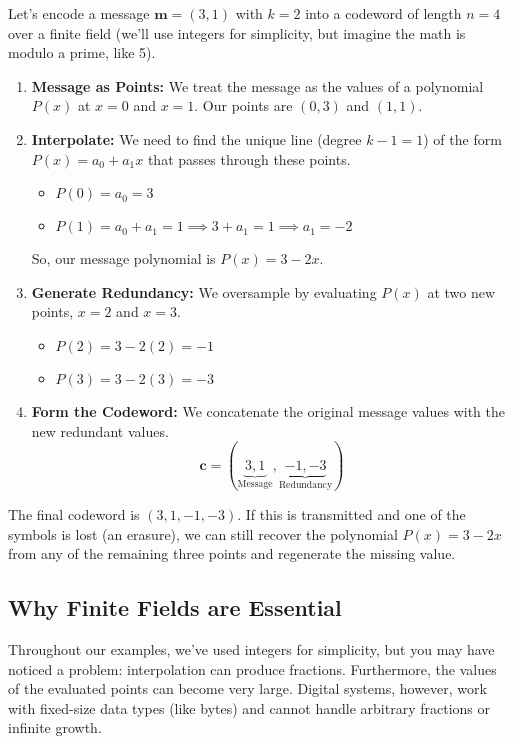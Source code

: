 \documentclass{article}
\begin{document}
\begin{tcolorbox}[title={Example: Systematic RS Encoding}]
Let's encode a message $\mathbf{m}=(3, 1)$ with $k=2$ into a codeword of length $n=4$ over a finite field (we'll use integers for simplicity, but imagine the math is modulo a prime, like 5).
\begin{enumerate}
    \item \textbf{Message as Points:} We treat the message as the values of a polynomial $P(x)$ at $x=0$ and $x=1$. Our points are $(0, 3)$ and $(1, 1)$.
    \item \textbf{Interpolate:} We need to find the unique line (degree $k-1=1$) of the form $P(x) = a_0 + a_1 x$ that passes through these points.
    \begin{itemize}
        \item $P(0) = a_0 = 3$
        \item $P(1) = a_0 + a_1 = 1 \implies 3 + a_1 = 1 \implies a_1 = -2$
    \end{itemize}
    So, our message polynomial is $P(x) = 3 - 2x$.

    \item \textbf{Generate Redundancy:} We oversample by evaluating $P(x)$ at two new points, $x=2$ and $x=3$.
    \begin{itemize}
        \item $P(2) = 3 - 2(2) = -1$
        \item $P(3) = 3 - 2(3) = -3$
    \end{itemize}
    \item \textbf{Form the Codeword:} We concatenate the original message values with the new redundant values.
    \[ \mathbf{c} = (\underbrace{3, 1}_{\text{Message}}, \underbrace{-1, -3}_{\text{Redundancy}}) \]
\end{enumerate}
The final codeword is $(3, 1, -1, -3)$. If this is transmitted and one of the symbols is lost (an erasure), we can still recover the polynomial $P(x)=3-2x$ from any of the remaining three points and regenerate the missing value.
\end{tcolorbox}

\subsection{Why Finite Fields are Essential}
Throughout our examples, we've used integers for simplicity, but you may have noticed a problem: interpolation can produce fractions. Furthermore, the values of the evaluated points can become very large. Digital systems, however, work with fixed-size data types (like bytes) and cannot handle arbitrary fractions or infinite growth.
\end{document}
